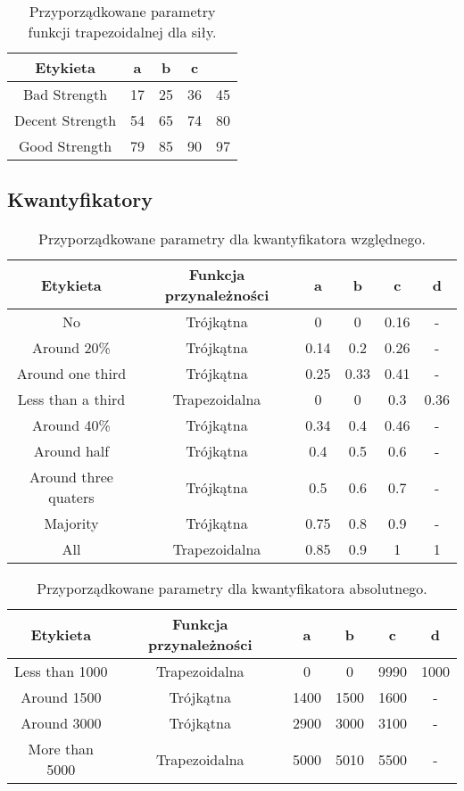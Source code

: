 \documentclass{classrep}
\begin{document}
\begin{table}[H]
	\centering
	\begin{tabular}{c c c c c} 
		\hline
		\textbf{Etykieta} & \textbf{a} & \textbf{b} & \textbf{c}  \\ [0.5ex] 
		\hline
		\hline 
		Bad Strength & 17 & 25 & 36 & 45 \\ 
		Decent Strength & 54 & 65 & 74 & 80 \\
		Good Strength & 79 & 85 & 90 & 97 \\
		\hline
	\end{tabular}
	\caption{Przyporządkowane parametry funkcji trapezoidalnej dla siły.}
\end{table}

\subsection{Kwantyfikatory}
\begin{table}[H]
	\centering
	\begin{tabular}{c c c c c c} 
		\hline
		\textbf{Etykieta} & \textbf{Funkcja przynależności} & \textbf{a} & \textbf{b} & \textbf{c} &  \textbf{d} \\ 
		\hline
		\hline 
		No & Trójkątna & 0 & 0 & 0.16 & - \\
		Around 20\% & Trójkątna & 0.14 & 0.2 & 0.26& - \\
		Around one third & Trójkątna & 0.25 &  0.33 &  0.41 & - \\
	    Less than a third & Trapezoidalna & 0 &  0 &  0.3 &  0.36\\
		Around 40\% & Trójkątna &  0.34 &  0.4 &  0.46 & - \\
		Around half & Trójkątna & 0.4 &  0.5 &  0.6 & - \\
		Around three quaters & Trójkątna &  0.5 &  0.6 &  0.7 & - \\
		Majority & Trójkątna & 0.75 &  0.8 &  0.9 & -  \\
		All & Trapezoidalna & 0.85 &  0.9 &  1 &  1 \\
		\hline
	\end{tabular}
	\caption{Przyporządkowane parametry dla kwantyfikatora względnego.}
\end{table}

\begin{table}[H]
	\centering
	\begin{tabular}{c c c c c c} 
		\hline
		\textbf{Etykieta} & \textbf{Funkcja przynależności} & \textbf{a} & \textbf{b} & \textbf{c} &  \textbf{d} \\ 
		\hline
		\hline 
		Less than 1000 & Trapezoidalna & 0 & 0 & 9990 & 1000 \\ 
		Around 1500 & Trójkątna & 1400 & 1500 & 1600 & - \\
		Around 3000 & Trójkątna & 2900 & 3000 & 3100 & - \\
		More than 5000 & Trapezoidalna & 5000 & 5010 & 5500 & - \\
		\hline
	\end{tabular}
	\caption{Przyporządkowane parametry dla kwantyfikatora absolutnego.}
\end{table}
\end{document}
